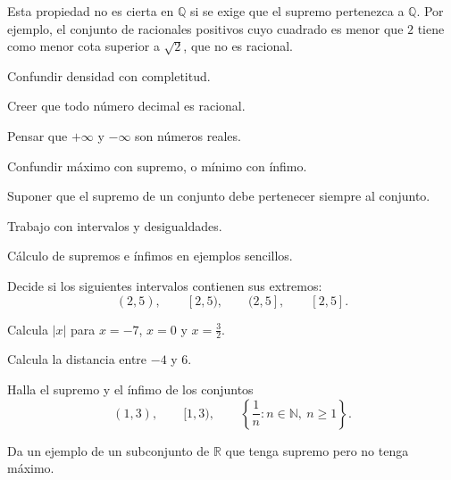 Esta propiedad no es cierta en \(\mathbb{Q}\) si se exige que el supremo pertenezca a \(\mathbb{Q}\). Por ejemplo, el conjunto de racionales positivos cuyo cuadrado es menor que \(2\) tiene como menor cota superior a \(\sqrt{2}\), que no es racional.

\begin{erroresfrecuentes}
  \item Confundir densidad con completitud.
  \item Creer que todo n\'umero decimal es racional.
  \item Pensar que \(+\infty\) y \(-\infty\) son n\'umeros reales.
  \item Confundir m\'aximo con supremo, o m\'inimo con \'infimo.
  \item Suponer que el supremo de un conjunto debe pertenecer siempre al conjunto.
\end{erroresfrecuentes}

\begin{seminario}
  \item Trabajo con intervalos y desigualdades.
  \item C\'alculo de supremos e \'infimos en ejemplos sencillos.
\end{seminario}

\begin{ejerciciospropuestos}
  \item Decide si los siguientes intervalos contienen sus extremos:
  \[
    (2,5),\qquad [2,5),\qquad (2,5],\qquad [2,5].
  \]
  \item Calcula \(|x|\) para \(x=-7\), \(x=0\) y \(x=\frac{3}{2}\).
  \item Calcula la distancia entre \(-4\) y \(6\).
  \item Halla el supremo y el \'infimo de los conjuntos
  \[
    (1,3),\qquad [1,3),\qquad \left\{\frac{1}{n}:n\in\mathbb{N},\ n\geq 1\right\}.
  \]
  \item Da un ejemplo de un subconjunto de \(\mathbb{R}\) que tenga supremo pero no tenga m\'aximo.
\end{ejerciciospropuestos}

